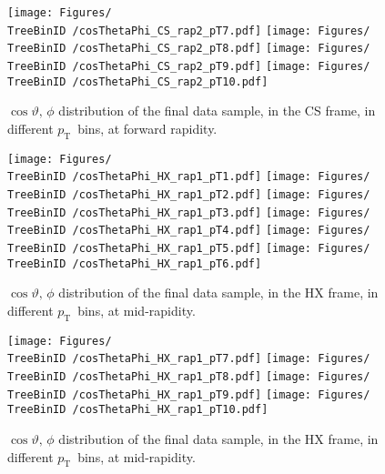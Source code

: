 \documentclass[12pt]{article}
\newcommand{\pt}{$p_{\mathrm{T}}$}
\providecommand{\TreeBinID}[1]{TreeBinIDDefault_rap1pt1}%
\begin{document}
\begin{figure}[htbp]
\centering
\texttt{[image: Figures/\\TreeBinID /cosThetaPhi\_CS\_rap2\_pT7.pdf]}
\texttt{[image: Figures/\\TreeBinID /cosThetaPhi\_CS\_rap2\_pT8.pdf]}
\texttt{[image: Figures/\\TreeBinID /cosThetaPhi\_CS\_rap2\_pT9.pdf]}
\texttt{[image: Figures/\\TreeBinID /cosThetaPhi\_CS\_rap2\_pT10.pdf]}
\caption{$\cos\vartheta,\,\phi$ distribution of the final data sample, in the CS
frame, in different \pt\ bins, at forward rapidity.}
\end{figure}
\clearpage





\begin{figure}[htbp]
\centering
\texttt{[image: Figures/\\TreeBinID /cosThetaPhi\_HX\_rap1\_pT1.pdf]}
\texttt{[image: Figures/\\TreeBinID /cosThetaPhi\_HX\_rap1\_pT2.pdf]}
\texttt{[image: Figures/\\TreeBinID /cosThetaPhi\_HX\_rap1\_pT3.pdf]}
\texttt{[image: Figures/\\TreeBinID /cosThetaPhi\_HX\_rap1\_pT4.pdf]}
\texttt{[image: Figures/\\TreeBinID /cosThetaPhi\_HX\_rap1\_pT5.pdf]}
\texttt{[image: Figures/\\TreeBinID /cosThetaPhi\_HX\_rap1\_pT6.pdf]}
\caption{$\cos\vartheta,\,\phi$ distribution of the final data sample, in the HX
frame, in different \pt\ bins, at mid-rapidity.}
\end{figure}
\clearpage

\begin{figure}[htbp]
\centering
\texttt{[image: Figures/\\TreeBinID /cosThetaPhi\_HX\_rap1\_pT7.pdf]}
\texttt{[image: Figures/\\TreeBinID /cosThetaPhi\_HX\_rap1\_pT8.pdf]}
\texttt{[image: Figures/\\TreeBinID /cosThetaPhi\_HX\_rap1\_pT9.pdf]}
\texttt{[image: Figures/\\TreeBinID /cosThetaPhi\_HX\_rap1\_pT10.pdf]}
\caption{$\cos\vartheta,\,\phi$ distribution of the final data sample, in the HX
frame, in different \pt\ bins, at mid-rapidity.}
\end{figure}
\clearpage
\end{document}
